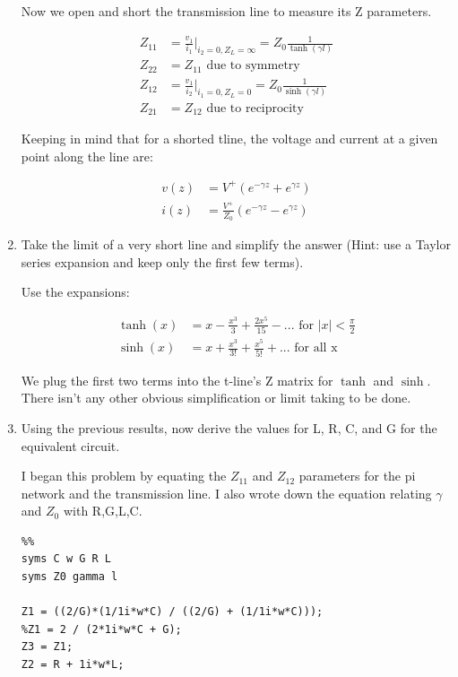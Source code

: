 \documentclass[11pt]{article}
\begin{document}
\begin{enumerate}
	Now we open and short the transmission line to measure its Z parameters.
	
	\begin{align*}
		Z_{11} &= \frac{v_1}{i_1} \bigg\rvert_{i_2 = 0, Z_L = \infty} = Z_0 \frac{1}{\tanh(\gamma l)} \\
		Z_{22} &= Z_{11} \text{ due to symmetry} \\
		Z_{12} &= \frac{v_1}{i_2} \bigg\rvert_{i_1 = 0, Z_L = 0} = Z_0 \frac{1}{\sinh(\gamma l)} \\
		Z_{21} &= Z_{12} \text{ due to reciprocity}
	\end{align*}
	
	Keeping in mind that for a shorted tline, the voltage and current at a given point along the line are:
	
	\begin{align*}
		v(z) &= V^+ (e^{-\gamma z} + e^{\gamma z}) \\
		i(z) &= \frac{V^+}{Z_0} (e^{-\gamma z} - e^{\gamma z})
	\end{align*}
	
	\item Take the limit of a very short line and simplify the answer (Hint: use a Taylor series expansion and keep only the first few terms).
	
	Use the expansions:
	
	\begin{align*}
		\tanh(x) &= x - \frac{x^3}{3} + \frac{2x^5}{15} - ... \text{ for } |x| < \frac{\pi}{2} \\
		\sinh(x) &= x + \frac{x^3}{3!} + \frac{x^5}{5!} + ... \text{ for all x}
	\end{align*}
	
	We plug the first two terms into the t-line's Z matrix for $\tanh$ and $\sinh$. There isn't any other obvious simplification or limit taking to be done. 
	
	\item Using the previous results, now derive the values for L, R, C, and G for the equivalent circuit.
	
	I began this problem by equating the $Z_{11}$ and $Z_{12}$ parameters for the pi network and the transmission line. I also wrote down the equation relating $\gamma$ and $Z_0$ with R,G,L,C. 
	
	\begin{verbatim}
%%
syms C w G R L
syms Z0 gamma l

Z1 = ((2/G)*(1/1i*w*C) / ((2/G) + (1/1i*w*C)));
%Z1 = 2 / (2*1i*w*C + G);
Z3 = Z1;
Z2 = R + 1i*w*L;


\end{verbatim}
\end{enumerate}
\end{document}
